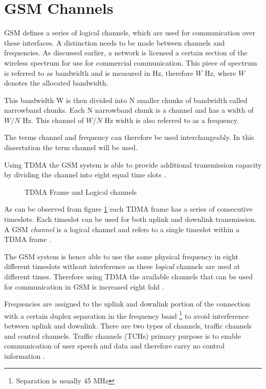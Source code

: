 \section{GSM Channels}
\label{sec:interfacech}
GSM defines a series of logical channels, which are used for communication over these interfaces. A distinction needs to be made between channels and frequencies. As discussed earlier, a network is licensed a certain section of the wireless spectrum for use for commercial communication. This piece of spectrum is referred to as bandwidth and is measured in Hz, therefore $W$ Hz, where $W$ denotes the allocated bandwidth\cite{FundamentalsWirelessCommunication}.

This bandwidth W is then divided into N smaller chunks of bandwidth called narrowband chunks. Each N narrowband chunk is a channel and has a width of $W/N$ Hz\cite{FundamentalsWirelessCommunication}. This channel of $W/N$ Hz width is also referred to as a frequency.\label{def:channel}

The terms channel and frequency can therefore be used interchangeably. In this dissertation the term channel will be used.

Using TDMA the GSM system is able to provide additional transmission capacity by dividing the channel into eight equal time slots \cite{wirelesstelcoMullet}. 
\begin{figure}[h]
	\begin{centering}
		
		\caption{TDMA Frame and Logical channels \cite{wirelesstelcoMullet}}
		\label{fig:GSMChannels}
	\end{centering}
\end{figure}
As can be observed from figure \ref{fig:GSMChannels} each TDMA frame has a series of consecutive timeslots. Each timeslot can be used for both uplink and downlink transmission. A GSM \emph{channel} is a logical channel and refers to a single timeslot within a TDMA frame \cite{wirelesstelcoMullet,GSMArchitectureProtocolsServices}.

The GSM system is hence able to use the same physical frequency in eight different timeslots without interference as these \emph{logical} channels are used at different times. Therefore using TDMA the available channels that can be used for communication in GSM is increased eight fold \cite{wirelesstelcoMullet}.

Frequencies are assigned to the uplink and downlink portion of the connection with a certain duplex separation in the frequency band \footnote{Separation is usually 45 MHz} to avoid interference between uplink and downlink. There are two types of channels, traffic channels and control channels. Traffic channels (TCHs) primary purpose is to enable communication of user speech and data and therefore carry no control information \cite{GSMArchitectureProtocolsServices}.

